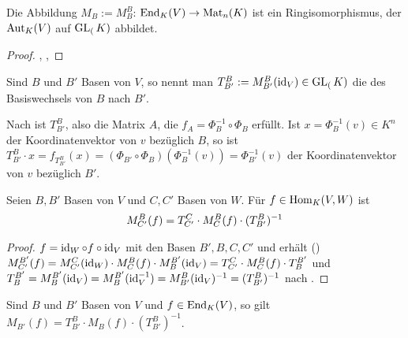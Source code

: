 \begin{conclusion}
	Die Abbildung $M_B:=M_B^B$: $\operatorname{End}_K(V)\to \operatorname{Mat}_n(K)$ ist ein Ringisomorphismus, der $\operatorname{Aut}_K(V)$ auf 
	$\operatorname{GL}_(K)$ abbildet.
\end{conclusion}
\begin{proof}
	, , 
\end{proof}

\begin{definition}[Transformationsmatrix]
	Sind $B$ und $B'$ Basen von $V$, so nennt man $T_{B'}^B:=M_{B'}^B(\operatorname{id}_V)\in 
	\operatorname{GL}_(K)$ die  des Basiswechsels von $B$ nach $B'$.
\end{definition}

\begin{remark}
	Nach  ist $T_{B'}^B$, also die Matrix $A$, die $f_A=\Phi_B^{-1}\circ \Phi_B$ 
	erfüllt. Ist $x=\Phi_B^{-1}(v)\in K^n$ der Koordinatenvektor von $v$ bezüglich $B$, so ist $T_{B'}^B\cdot 
	x=f_{T_{B'}^B}(x)=(\Phi_{B'}\circ \Phi_B)(\Phi_B^{-1}(v))=\Phi_{B'}^{-1}(v)$ der Koordinatenvektor von $v$ 
	bezüglich $B'$.
\end{remark}

\begin{proposition}[Transformationsformel]
	Seien $B,B'$ Basen von $V$ und $C,C'$ Basen von $W$. Für $f\in \operatorname{Hom}_K(V,W)$ ist 
	\begin{align}
		M_{C'}^B(f)=T_{C'}^C\cdot M_C^B(f)\cdot (T_{B'}^B)^{-1}\notag
	\end{align}
\end{proposition}
\begin{proof}
	$f=\operatorname{id}_W\circ f \circ \operatorname{id}_V$ mit den Basen $B',B,C,C'$ und erhält () $M_{C'}^{B'}(f)=M_{C'}^C(\operatorname{id}_W)\cdot M_C^B(f)\cdot
	M_B^{B'}(\operatorname{id}_V)=T_{C'}^C\cdot M_C^B(f)\cdot T_B^{B'}$ und $T_B^{B'}=M_B^{B'}(\operatorname{id}_V)=M_B^{B'}(\operatorname{id}_V^{-1})=M_{B'}^B(\operatorname{id}_V)^
	{-1}=(T_{B'}^B)^{-1}$ nach .
\end{proof}

\begin{conclusion}
	Sind $B$ und $B'$ Basen von $V$ und $f\in \operatorname{End}_K(V)$, so gilt $M_{B'}(f)=T_{B'}^B \cdot M_B(f)
	\cdot (T_{B'}^B)^{-1}$.
\end{conclusion}